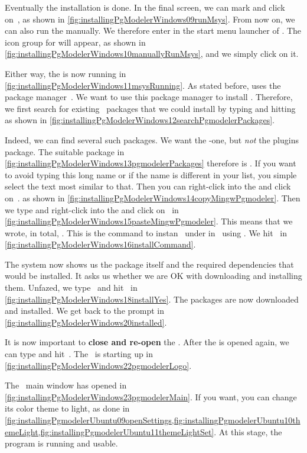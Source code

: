 Eventually the installation is done.
In the final screen, we can mark  and click on~, as shown in \cref{fig:installingPgModelerWindows09runMsys}.
From now on, we can also run the   manually.
We therefore enter  in the start menu launcher of \microsoftWindows.
The icon group for  will appear, as shown in \cref{fig:installingPgModelerWindows10manuallyRunMsys}, and we simply click on it.

Either way, the   is now running in \cref{fig:installingPgModelerWindows11msysRunning}.
As stated before,  uses the  package manager~\cite{VGL2002:P,TOSID2025L:COMPMS}.
We want to use this package manager to install \pgmodeler.
Therefore, we first search for existing \pgmodeler\ packages that we could install by typing  and hitting~\keys{\return} as shown in \cref{fig:installingPgModelerWindows12searchPgmodelerPackages}.

Indeed, we can find several such packages.
We want the -one, but \emph{not} the plugins package.
The suitable package in \cref{fig:installingPgModelerWindows13pgmodelerPackages} therefore is .
If you want to avoid typing this long name or if the name is different in your list, you simple select the text most similar to that.
Then you can right-click into the  and click on~. as shown in  \cref{fig:installingPgModelerWindows14copyMingwPgmodeler}.
Then we type  and right-click into the  and click on~ in \cref{fig:installingPgModelerWindows15pasteMingwPgmodeler}.
This means that we wrote, in total, .
This is the command to instan \pgmodeler\ under  in \microsoftWindows\ using .
We hit~\keys{\return} in \cref{fig:installingPgModelerWindows16installCommand}.

The system now shows us the package itself and the required dependencies that would be installed.
It asks us whether we are OK with downloading and installing them.
Unfazed, we type~ and hit~\keys{\return} in \cref{fig:installingPgModelerWindows18installYes}.
The packages are now downloaded and installed.
We get back to the  prompt in \cref{fig:installingPgModelerWindows20installed}.

It is now important to \textbf{close and re-open} the  .
After the  is opened again, we can type  and hit~\keys{\return}.
The \pgmodeler\ is starting up in \cref{fig:installingPgModelerWindows22pgmodelerLogo}.

The \pgmodeler\ main window has opened in \cref{fig:installingPgModelerWindows23pgmodelerMain}.
If you want, you can change its color theme to light, as done in \cref{fig:installingPgmodelerUbuntu09openSettings,fig:installingPgmodelerUbuntu10themeLight,fig:installingPgmodelerUbuntu11themeLightSet}.
At this stage, the program is running and usable.%
%
\FloatBarrier%
\endhsection%
%

